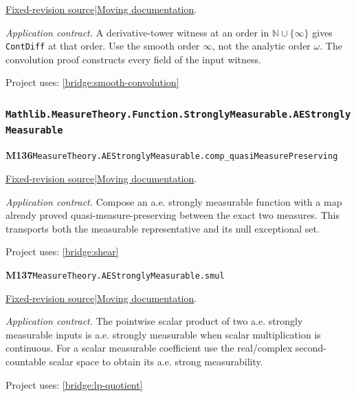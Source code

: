 \documentclass[11pt,a4paper]{article}
\theoremstyle{definition}
\theoremstyle{remark}
\begin{document}
\href{https://github.com/leanprover-community/mathlib4/blob/9bac2d0692944a775113f7c130fd5e5b4608a854/Mathlib/Analysis/Calculus/ContDiff/Defs.lean}{Fixed-revision source}\quad|\quad\href{https://leanprover-community.github.io/mathlib4_docs/Mathlib/Analysis/Calculus/ContDiff/Defs.html#HasFTaylorSeriesUpTo.contDiff}{Moving documentation}.\par
\noindent\textit{Application contract.} A derivative-tower witness at an order in $\mathbb N\cup\{\infty\}$ gives \nolinkurl{ContDiff} at that order. Use the smooth order $\infty$, not the analytic order $\omega$. The convolution proof constructs every field of the input witness.\par
{\small Project uses: \ref{bridge:smooth-convolution}}\par\medskip

\subsubsection*{\nolinkurl{Mathlib.MeasureTheory.Function.StronglyMeasurable.AEStronglyMeasurable}}
\noindent\textbf{M136}\label{base:M136}\quad\nolinkurl{MeasureTheory.AEStronglyMeasurable.comp_quasiMeasurePreserving}

\href{https://github.com/leanprover-community/mathlib4/blob/9bac2d0692944a775113f7c130fd5e5b4608a854/Mathlib/MeasureTheory/Function/StronglyMeasurable/AEStronglyMeasurable.lean}{Fixed-revision source}\quad|\quad\href{https://leanprover-community.github.io/mathlib4_docs/Mathlib/MeasureTheory/Function/StronglyMeasurable/AEStronglyMeasurable.html#MeasureTheory.AEStronglyMeasurable.comp_quasiMeasurePreserving}{Moving documentation}.\par
\noindent\textit{Application contract.} Compose an a.e. strongly measurable function with a map already proved quasi-measure-preserving between the exact two measures. This transports both the measurable representative and its null exceptional set.\par
{\small Project uses: \ref{bridge:shear}}\par\medskip

\noindent\textbf{M137}\label{base:M137}\quad\nolinkurl{MeasureTheory.AEStronglyMeasurable.smul}

\href{https://github.com/leanprover-community/mathlib4/blob/9bac2d0692944a775113f7c130fd5e5b4608a854/Mathlib/MeasureTheory/Function/StronglyMeasurable/AEStronglyMeasurable.lean}{Fixed-revision source}\quad|\quad\href{https://leanprover-community.github.io/mathlib4_docs/Mathlib/MeasureTheory/Function/StronglyMeasurable/AEStronglyMeasurable.html#MeasureTheory.AEStronglyMeasurable.smul}{Moving documentation}.\par
\noindent\textit{Application contract.} The pointwise scalar product of two a.e. strongly measurable inputs is a.e. strongly measurable when scalar multiplication is continuous. For a scalar measurable coefficient use the real/complex second-countable scalar space to obtain its a.e. strong measurability.\par
{\small Project uses: \ref{bridge:lp-quotient}}\par\medskip
\end{document}

